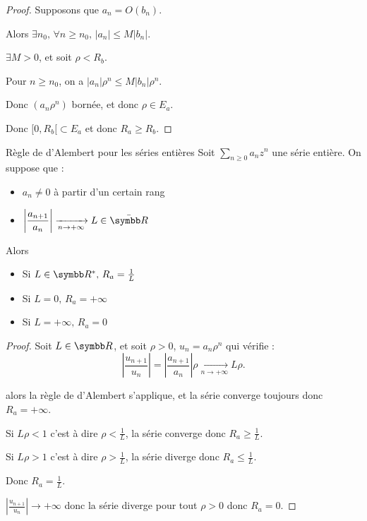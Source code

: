 
\begin{proof}
    Supposons que $a_n = O(b_n)$. 

    Alors $\exists n_0, \, \forall n \geqslant n_0, \, |a_n| \leqslant M |b_n|$.

    $\exists M > 0$, et soit $\rho < R_b$. 

    Pour $n \geqslant n_0$, on a $|a_n| \rho^n \leqslant M |b_n| \rho^n$.

    Donc $(a_n \rho^n)$ bornée, et donc $\rho \in E_a$.

    Donc $[0, R_b[ \subset E_a$ et donc $R_a \geqslant R_b$.
\end{proof}



\begin{theoreme}{Règle de d'Alembert pour les séries entières}{}
    Soit $\sum_{n \geqslant 0} a_n z^n$ une série entière. On suppose que : 
    \begin{itemize}
        \item $a_n \neq 0$ à partir d'un certain rang
        \item $\displaystyle \left| \frac{a_{n + 1 }}{a_n } \right| \xrightarrow[n \to + \infty   ]{} L \in \bar{\R}$ 
    \end{itemize}

    Alors 
    \begin{itemize}
        \item Si $L \in \R^*, \, R_a = \frac 1 L$
        \item Si $L = 0, \, R_a = +\infty$
        \item Si $L = +\infty, \, R_a = 0$
    \end{itemize}
\end{theoreme}


\begin{proof}
    Soit $L \in \R$, et soit $\rho > 0$, $u_n = a_n \rho^n$ qui vérifie :
    \[
        \left| \frac{u_{n + 1}}{u_n} \right| = \left| \frac{a_{n + 1}}{a_n} \right| \rho \xrightarrow[n \to + \infty ]{} L \rho.
    \]

     alors la règle de d'Alembert s'applique, et la série converge toujours 
    donc $R_a = +\infty$.

    
    \avspace Si $L \rho < 1$ c'est à dire $\rho < \frac 1 L$, la série converge donc $R_a \geqslant \frac 1 L$.

    Si $L \rho > 1$ c'est à dire $\rho > \frac 1 L$, la série diverge donc $R_a \leqslant \frac 1 L$.

    Donc $R_a = \frac 1 L$.


    \avspace $\displaystyle \left| \frac{u_{n + 1}}{u_n } \right| \to + \infty$ donc la série diverge 
    pour tout $\rho > 0$ donc $R_a = 0$.
\end{proof}

